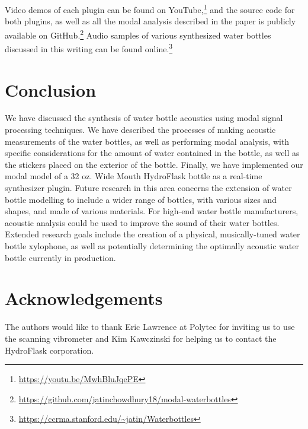 \documentclass[twoside,a4paper]{article}
\begin{document}
Video demos of each plugin can be found on
YouTube,\footnote{\url{https://youtu.be/MwhBluJqePE}}
and the source code for both plugins, as well as all the modal
analysis described in the paper is publicly available on
GitHub.\footnote{\url{https://github.com/jatinchowdhury18/modal-waterbottles}}
Audio samples of various synthesized water bottles discussed in this
writing can be found online.\footnote{\url{https://ccrma.stanford.edu/~jatin/Waterbottles}}

%
\section{Conclusion} \label{sec:conclusion}
%
We have discussed the synthesis of water bottle acoustics
using modal signal processing techniques. We have described the processes
of making acoustic measurements of the water bottles, as well as performing
modal analysis, with specific considerations for the amount of water
contained in the bottle, as well as the stickers placed on the exterior
of the bottle. Finally, we have implemented our modal model of a 32 oz.
Wide Mouth HydroFlask bottle as a real-time synthesizer plugin.
\newline\newline
Future research in this area concerns the extension of water bottle
modelling to include a wider range of bottles, with various sizes and
shapes, and made of various materials. For high-end water bottle
manufacturers, acoustic analysis could be used to improve the sound
of their water bottles. Extended research goals include the creation
of a physical, musically-tuned water bottle xylophone, as well as potentially
determining the optimally acoustic water bottle currently in production.

\section{Acknowledgements}
%
The authors would like to thank Eric Lawrence at Polytec for inviting us to use the scanning vibrometer and Kim Kawczinski for helping us to contact
the HydroFlask corporation.

\nocite{*}


\end{document}
